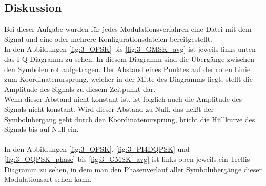 \documentclass[12pt,a4paper,ngerman]{article}
\begin{document}
\subsection{Diskussion}
Bei dieser Aufgabe wurden für jedes Modulationsverfahren eine Datei mit dem Signal und eine oder mehrere Konfigurationsdateien bereitgestellt.\\
In den Abbildungen \ref{fig:3_QPSK} bis \ref{fig:3_GMSK_avg} ist jeweils links unten das I-Q-Diagramm zu sehen. In diesem Diagramm sind die Übergänge zwischen den Symbolen rot aufgetragen. Der Abstand eines Punktes auf der roten Linie zum Koordinatenursprung, welcher in der Mitte des Diagramms liegt, stellt die Amplitude des Signals zu diesem Zeitpunkt dar.\\
Wenn dieser Abstand nicht konstant ist, ist folglich auch die Amplitude des Signals nicht konstant. Wird dieser Abstand zu Null, das heißt der Symbolübergang geht durch den Koordinatenursprung, bricht die Hüllkurve des Signals bis auf Null ein.\\
\\
In den Abbildungen \ref{fig:3_QPSK}, \ref{fig:3_PI4DQPSK} und \ref{fig:3_OQPSK_phase} bis \ref{fig:3_GMSK_avg} ist links oben jeweils ein Trellis-Diagramm zu sehen, in dem man den Phasenverlauf aller Symbolübergänge dieser Modulationsart sehen kann.\\
\\
\end{document}
